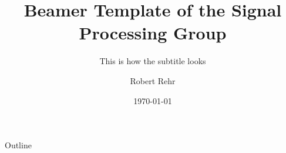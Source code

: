 \documentclass[10pt,aspectratio=169]{beamer}
\title[This is the short title]{Beamer Template of the Signal Processing Group}
\subtitle{This is how the subtitle looks}
\author[Short Name]{Robert Rehr}
\institute[Uni Hamburg]{University of Hamburg\\ Department of Informatics}
\date{\today}
\begin{document}
\begin{frame}[plain]
    \maketitle
\end{frame}

\begin{frame}{Outline}
    \tableofcontents
\end{frame}












\end{document}
